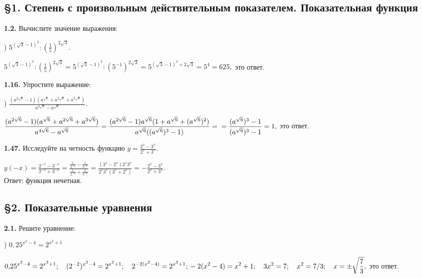 \documentclass[a5paper,10pt]{article}
\begin{document}

\subsection* {\S 1. Степень с произвольным действительным показателем. Показательная функция}

{\bf 1.2.} Вычислите значение выражения:

\medskip
{}) $\displaystyle 5^{(\sqrt3-1)^2}:\left(\frac15\right)^{2\sqrt3}.$

\medskip
\noindent
$\displaystyle 5^{(\sqrt3-1)^2}:\left(\frac15\right)^{2\sqrt3}=5^{(\sqrt3-1)^2}:\left(5^{-1}\right)^{2\sqrt3}=5^{(\sqrt3-1)^2+2\sqrt3}=5^4=625,$ это ответ.

\medskip
\noindent
{\bf 1.16.} Упростите выражение:

\medskip
{}) $\displaystyle \frac{(a^{2\sqrt6}-1)(a^{\sqrt6}+a^{2\sqrt6}+a^{3\sqrt6})}{a^{4\sqrt6}-a^{\sqrt6}}.$

\medskip
\noindent
$\displaystyle \frac{(a^{2\sqrt6}-1)(a^{\sqrt6}+a^{2\sqrt6}+a^{3\sqrt6})}{a^{4\sqrt6}-a^{\sqrt6}}
=\frac{(a^{2\sqrt6}-1)a^{\sqrt6}(1+a^{\sqrt6}+(a^{\sqrt6})^2)}{a^{\sqrt6}((a^{\sqrt6})^3-1)}=\\
=\frac{(a^{\sqrt6})^3-1}{(a^{\sqrt6})^3-1}=1,$ это ответ.

\medskip
\noindent
{\bf 1.47.} Исследуйте на четность функцию $\displaystyle y=\frac{2^x-3^x}{2^x+3^x}.$

\medskip
\noindent
$\displaystyle y(-x)=\frac{2^{-x}-3^{-x}}{2^{-x}+3^{-x}}=
\frac{\frac{1}{2^{-x}}-\frac{1}{3^{-x}}}{\frac{1}{2^{-x}}+\frac{1}{3^{-x}}}=
\frac{(3^x-2^x)2^x3^x}{2^x3^x(3^x+2^x)}=-\frac{2^x-3^x}{2^x+3^x}.$\\[3pt]
Ответ: функция нечетная.

\subsection* {\S 2. Показательные уравнения}

{\bf 2.1.}  Решите уравнение:

\medskip
{}) $0{,}25^{x^2-4}=2^{x^2+1}$

\medskip
\noindent
$\displaystyle 0{,}25^{x^2-4}=2^{x^2+1};\quad (2^{-2})^{x^2-4}=
2^{x^2+1};\quad 2^{-2(x^2-4)}=2^{x^2+1};\\
-2(x^2-4)=x^2+1;\quad 3x^2=7;\quad x^2 = 7/3;\quad x =
 \pm\sqrt\frac73,$ это ответ.
\end{document}

